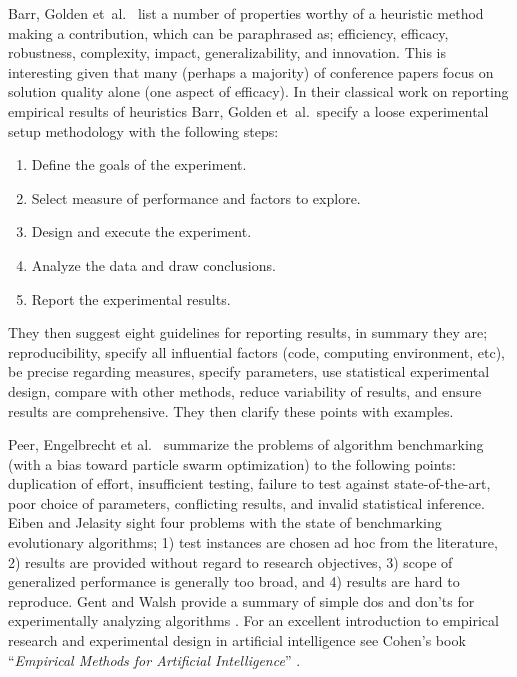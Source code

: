 Barr, Golden et~al.\ \cite{Barr1995} list a number of properties worthy of a heuristic method making a contribution, which can be paraphrased as; efficiency, efficacy, robustness, complexity, impact, generalizability, and innovation. This is interesting given that many (perhaps a majority) of conference papers focus on solution quality alone (one aspect of efficacy).
In their classical work on reporting empirical results of heuristics Barr, Golden et~al.\ specify a loose experimental setup methodology with the following steps:

\begin{enumerate}
	\item Define the goals of the experiment.
	\item Select measure of performance and factors to explore.
	\item Design and execute the experiment.
	\item Analyze the data and draw conclusions.
	\item Report the experimental results.
\end{enumerate}

They then suggest eight guidelines for reporting results, in summary they are; reproducibility, specify all influential factors (code, computing environment, etc), be precise regarding measures, specify parameters, use statistical experimental design, compare with other methods, reduce variability of results, and ensure results are comprehensive. They then clarify these points with examples.

Peer, Engelbrecht et al.\ \cite{Peer2003} summarize the problems of algorithm benchmarking (with a bias toward particle swarm optimization) to the following points: duplication of effort, insufficient testing, failure to test against state-of-the-art, poor choice of parameters, conflicting results, and invalid statistical inference. Eiben and Jelasity \cite{Eiben2002} sight four problems with the state of benchmarking evolutionary algorithms; 1) test instances are chosen ad hoc from the literature, 2) results are provided without regard to research objectives, 3) scope of generalized performance is generally too broad, and 4) results are hard to reproduce.
Gent and Walsh provide a summary of simple dos and don'ts for experimentally analyzing algorithms \cite{Gent1994}. For an excellent introduction to empirical research and experimental design in artificial intelligence see Cohen's book ``\emph{Empirical Methods for Artificial Intelligence}'' \cite{Cohen1995}.

